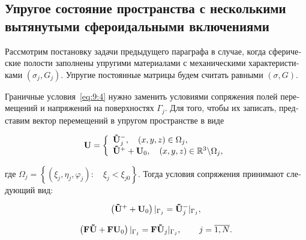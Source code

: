 \begin{russian}
\section[Упругое состояние пространства с несколькими вытянутыми сфероидальными включениями]{Упругое состояние пространства с несколькими вытянутыми сфероидальными включениями}


Рассмотрим постановку задачи предыдущего параграфа в случае, когда сферические полости заполнены упругими материалами с механическими характеристиками $(\sigma_j,G_j)$. Упругие постоянные матрицы будем считать равными $(\sigma,G)$.

Граничные условия~\eqref{eq:9:4} нужно заменить условиями сопряжения полей перемещений и напряжений на поверхностях $\Gamma_j$. Для того, чтобы их записать, представим вектор перемещений в упругом пространстве в виде

\begin{equation}
{\bf{U}} = \left\{ {\begin{array}{*{20}{l}}
{{\bf{\tilde U}}_j^ - ,\quad \left( {x,y,z} \right) \in {\Omega _j},}\\
{{{{\bf{\tilde U}}}^ + } + {{\bf{U}}_0},\quad \left( {x,y,z} \right) \in\mathbb{R}^3\backslash {\Omega _j},}
\end{array}} \right.
\label{eq:9:5}
\end{equation}

\noindent где ${\Omega _j} = \left\{ {\left( {{\xi _j},{\eta _j},{\varphi _j}} \right):\quad {\xi _j} < {\xi _{j0}}} \right\}$. Тогда условия сопряжения принимают следующий вид:

\begin{equation}
\left( {{{{\bf{\tilde U}}}^ + } + {{\bf{U}}_0}} \right){|_{{\Gamma _j}}} = {\bf{\tilde U}}_j^ - {|_{{\Gamma _j}}},
\label{eq:9:6}
\end{equation}

\begin{equation}
\left( {{\bf{F\tilde U}} + {\bf{F}}{{\bf{U}}_0}} \right){|_{{\Gamma _j}}} = {\bf{F}}{{\bf{\tilde U}}_j}{|_{{\Gamma _j}}},\qquad {\kern 1pt} j = \overline {1,N}.
\label{eq:9:9}
\end{equation}


\end{russian}
